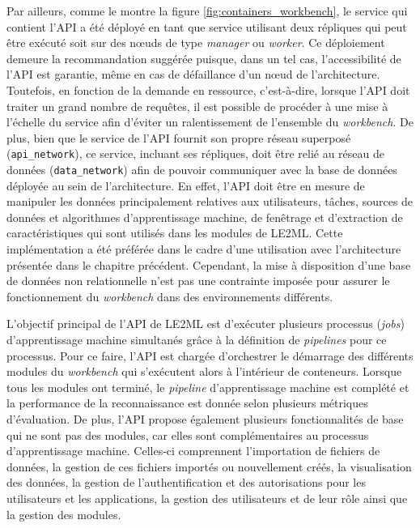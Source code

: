 Par ailleurs, comme le montre la figure \ref{fig:containers_workbench}, le service qui contient l'\acs{API} a été déployé en tant que service utilisant deux répliques qui peut être exécuté soit sur des n\oe{}uds de type \textit{manager} ou \textit{worker}. Ce déploiement demeure la recommandation suggérée puisque, dans un tel cas, l'accessibilité de l'\acs{API} est garantie, même en cas de défaillance d'un n\oe{}ud de l'architecture. Toutefois, en fonction de la demande en ressource, c'est-à-dire, lorsque l'API doit traiter un grand nombre de requêtes, il est possible de procéder à une mise à l'échelle du service afin d'éviter un ralentissement de l'ensemble du \textit{workbench}. De plus, bien que le service de l'\acs{API} fournit son propre réseau superposé (\texttt{api\_network}), ce service, incluant ses répliques, doit être relié au réseau de données (\texttt{data\_network}) afin de pouvoir communiquer avec la base de données déployée au sein de l'architecture. En effet, l'\acs{API} doit être en mesure de manipuler les données principalement relatives aux utilisateurs, tâches, sources de données et algorithmes d'apprentissage machine, de fenêtrage et d'extraction de caractéristiques qui sont utilisés dans les modules de \acs{LE2ML}. Cette implémentation a été préférée dans le cadre d'une utilisation avec l'architecture présentée dans le chapitre précédent. Cependant, la mise à disposition d'une base de données non relationnelle n'est pas une contrainte imposée pour assurer le fonctionnement du \textit{workbench} dans des environnements différents.

L'objectif principal de l'\acs{API} de \acs{LE2ML} est d'exécuter plusieurs processus (\emph{jobs}) d'apprentissage machine simultanés grâce à la définition de \textit{pipelines} pour ce processus. Pour ce faire, l'API est chargée d'orchestrer le démarrage des différents modules du \textit{workbench} qui s'exécutent alors à l'intérieur de conteneurs. Lorsque tous les modules ont terminé, le \textit{pipeline} d'apprentissage machine est complété et la performance de la reconnaissance est donnée selon plusieurs métriques d'évaluation. De plus, l'\acs{API} propose également plusieurs fonctionnalités de base qui ne sont pas des modules, car elles sont complémentaires au processus d'apprentissage machine. Celles-ci comprennent l'importation de fichiers de données, la gestion de ces fichiers importés ou nouvellement créés, la visualisation des données, la gestion de l'authentification et des autorisations pour les utilisateurs et les applications, la gestion des utilisateurs et de leur rôle ainsi que la gestion des modules.

